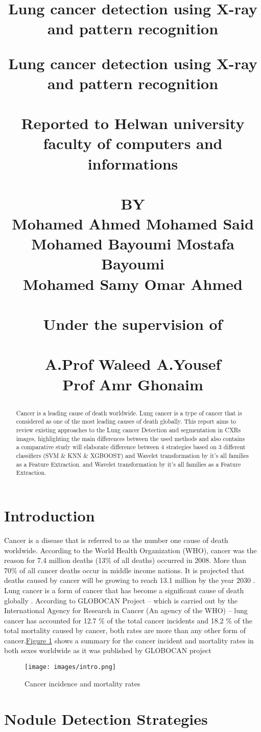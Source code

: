 \documentclass[hidelinks,12pt]{article}
\title{Lung cancer detection using X-ray and pattern recognition\\}
\title{\textbf{Lung cancer detection using X-ray and pattern recognition }\\~\\
Reported to Helwan university\\
faculty of computers and informations\\~\\
\textbf{BY} \\
Mohamed Ahmed \quad Mohamed Said \\
Mohamed Bayoumi \quad Mostafa Bayoumi \\
Mohamed Samy \quad Omar Ahmed \\~\\
\textbf{Under the supervision of} \\~\\
\textbf{A.Prof Waleed A.Yousef} \\
\textbf{Prof Amr Ghonaim}
\date{}
}
\begin{document}
\maketitle
 \newpage
\begin{abstract}
  Cancer is a leading cause of death worldwide.
Lung cancer is a type of cancer that is considered as one of the most leading causes of death globally.
This report aims  to review existing approaches to the Lung cancer Detection and segmentation in CXRs images, highlighting the main differences between the used methods and also contains a comparative study will elaborate difference between 4 strategies based on 3 different classifiers 
(SVM  \& KNN \& XGBOOST) and Wavelet transformation by it's all families as a Feature Extraction.
and Wavelet transformation by it’s all families as a Feature Extraction.
\end{abstract}

\section{Introduction}
Cancer is a disease that is referred to as the number
one cause of death worldwide. According to the World
Health Organization (WHO), cancer was the reason
for 7.4 million deaths (13\% of all deaths) occurred in
2008. More than 70\% of all cancer deaths occur in middle
income nations. It is projected that deaths caused by
cancer will be growing to reach 13.1 million by the year
2030 .
Lung cancer is a form of cancer that has become a
significant cause of death globally . According to
GLOBOCAN Project – which is carried out by the
International Agency for Research in Cancer (An agency
of the WHO) – lung cancer has accounted for 12.7 \% of
the total cancer incidents and 18.2 \% of the total mortality
caused by cancer, both rates are more than any other form
of cancer.\hyperref[fig:5]{Figure 1} shows a summary for the cancer incident and mortality rates in both sexes worldwide as it
was published by GLOBOCAN project

\begin{figure}[h]
           \texttt{[image: images/intro.png]}
           \centering
           \label{fig:5}
           \caption{Cancer incidence and mortality rates}
    \end{figure}

\newpage

\section{Nodule Detection Strategies}
\end{document}
